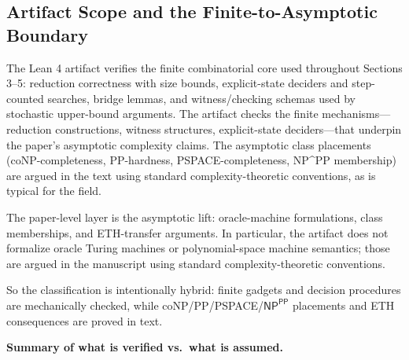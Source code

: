 \subsection{Artifact Scope and the Finite-to-Asymptotic Boundary}\label{sec:artifact-scope}

The Lean 4 artifact verifies the finite combinatorial core used throughout Sections 3--5: reduction correctness with size bounds, explicit-state deciders and step-counted searches, bridge lemmas, and witness/checking schemas used by stochastic upper-bound arguments. The artifact checks the finite mechanisms—reduction constructions, witness structures, explicit-state deciders—that underpin the paper's asymptotic complexity claims. The asymptotic class placements (coNP-completeness, PP-hardness, PSPACE-completeness, NP\^{}PP membership) are argued in the text using standard complexity-theoretic conventions, as is typical for the field.

The paper-level layer is the asymptotic lift: oracle-machine formulations, class memberships, and ETH-transfer arguments. In particular, the artifact does not formalize oracle Turing machines or polynomial-space machine semantics; those are argued in the manuscript using standard complexity-theoretic conventions.

So the classification is intentionally hybrid: finite gadgets and decision procedures are mechanically checked, while coNP/PP/PSPACE/$\mathsf{NP}^{\mathsf{PP}}$ placements and ETH consequences are proved in text.

\bigskip
\noindent\textbf{Summary of what is verified vs.\ what is assumed.}

